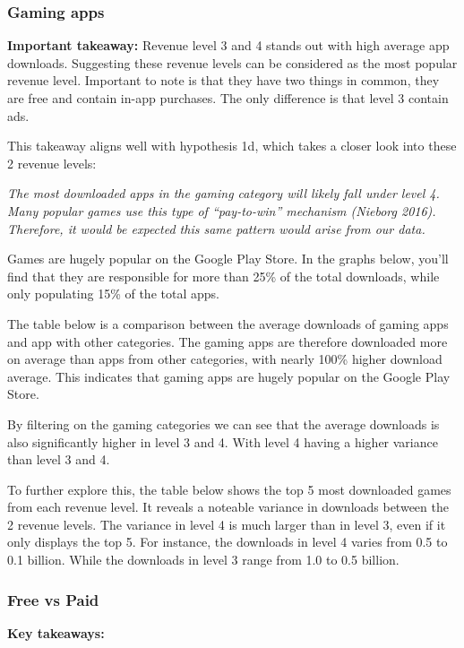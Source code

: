 \documentclass[
  12pt,
  a4paper,
]{article}
\begin{document}
\subsubsection{Gaming apps}\label{gaming-apps}

\textbf{Important takeaway:} Revenue level 3 and 4 stands out with high
average app downloads. Suggesting these revenue levels can be considered
as the most popular revenue level. Important to note is that they have
two things in common, they are free and contain in-app purchases. The
only difference is that level 3 contain ads.

This takeaway aligns well with hypothesis 1d, which takes a closer look
into these 2 revenue levels:

\emph{The most downloaded apps in the gaming category will likely fall
under level 4. Many popular games use this type of ``pay-to-win''
mechanism (Nieborg 2016). Therefore, it would be expected this same
pattern would arise from our data.}

Games are hugely popular on the Google Play Store. In the graphs below,
you'll find that they are responsible for more than 25\% of the total
downloads, while only populating 15\% of the total apps.

The table below is a comparison between the average downloads of gaming
apps and app with other categories. The gaming apps are therefore
downloaded more on average than apps from other categories, with nearly
100\% higher download average. This indicates that gaming apps are
hugely popular on the Google Play Store.

By filtering on the gaming categories we can see that the average
downloads is also significantly higher in level 3 and 4. With level 4
having a higher variance than level 3 and 4.

To further explore this, the table below shows the top 5 most downloaded
games from each revenue level. It reveals a noteable variance in
downloads between the 2 revenue levels. The variance in level 4 is much
larger than in level 3, even if it only displays the top 5. For
instance, the downloads in level 4 varies from 0.5 to 0.1 billion. While
the downloads in level 3 range from 1.0 to 0.5 billion.

\subsubsection{Free vs Paid}\label{free-vs-paid}

\textbf{Key takeaways:}
\end{document}
